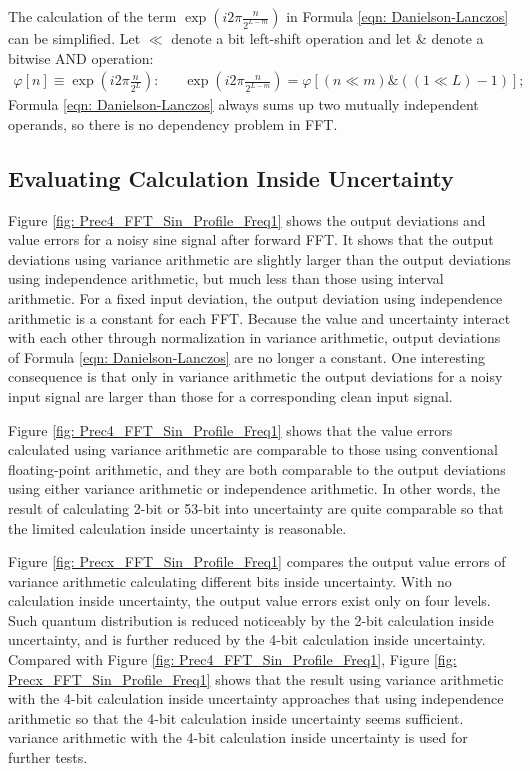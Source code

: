 \documentclass[twoside]{article}
\numberwithin{equation}{section}
\newcommand{\eqspace}{\;\;\;}
\begin{document}
The calculation of the term $\exp{(i 2\pi \frac{n}{2^{L-m}})}$ in Formula \eqref{eqn: Danielson-Lanczos} can be simplified.  
Let $\ll$ denote a bit left-shift operation and let \& denote a bitwise AND operation:
\begin{align}
\label{eqn: FFT phase array}
\varphi [n] \equiv \exp{(i 2\pi \frac{n}{2^{L}})}: \eqspace & \exp{(i 2\pi \frac{n}{2^{L-m}})} = \varphi [(n \ll m)\& ((1 \ll L)-1)];
\end{align}
Formula \eqref{eqn: Danielson-Lanczos} always sums up two mutually independent operands, so there is no dependency problem in FFT.  




\subsection{Evaluating Calculation Inside Uncertainty}

Figure \ref{fig: Prec4_FFT_Sin_Profile_Freq1} shows the output deviations and value errors for a noisy sine signal after forward FFT.  It shows that the output deviations using variance arithmetic are slightly larger than the output deviations using independence arithmetic, but much less than those using interval arithmetic.  For a fixed input deviation, the output deviation using independence arithmetic is a constant for each FFT.  Because the value and uncertainty interact with each other through normalization in variance arithmetic, output deviations of Formula \eqref{eqn: Danielson-Lanczos} are no longer a constant.  One interesting consequence is that only in variance arithmetic the output deviations for a noisy input signal are larger than those for a corresponding clean input signal.

Figure \ref{fig: Prec4_FFT_Sin_Profile_Freq1} shows that the value errors calculated using variance arithmetic are comparable to those using conventional floating-point arithmetic, and they are both comparable to the output deviations using either variance arithmetic or independence arithmetic.  In other words, the result of calculating 2-bit or 53-bit into uncertainty are quite comparable so that the limited calculation inside uncertainty is reasonable.  

Figure \ref{fig: Precx_FFT_Sin_Profile_Freq1} compares the output value errors of variance arithmetic calculating different bits inside uncertainty.  With no calculation inside uncertainty, the output value errors exist only on four levels.  Such quantum distribution is reduced noticeably by the 2-bit calculation inside uncertainty, and is further reduced by the 4-bit calculation inside uncertainty.  Compared with Figure \ref{fig: Prec4_FFT_Sin_Profile_Freq1}, Figure \ref{fig: Precx_FFT_Sin_Profile_Freq1} shows that the result using variance arithmetic with the 4-bit calculation inside uncertainty approaches that using independence arithmetic so that the 4-bit calculation inside uncertainty seems sufficient.  variance arithmetic with the 4-bit calculation inside uncertainty is used for further tests.
\end{document}
